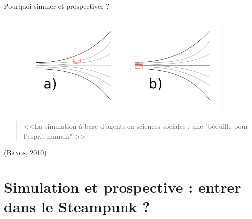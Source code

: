 \documentclass[newPxFont]{beamer}
\begin{document}
\begin{frame}[c]{Pourquoi simuler et prospectiver ?}
  \vspace{-2em}
  \begin{figure}
   \includegraphics[height=5cm]{img/a_prospective_simulation.png}
  \end{figure}
  \vspace{-1em}
  \begin{quote}
    <<La simulation à base d’agents en sciences sociales : une "béquille pour l’esprit humain" >>
  \end{quote}
  \hspace*{\fill}\textsc{(Banos, 2010)}
\end{frame}
%
%
\section{Simulation et prospective : entrer dans le Steampunk ?}
\end{document}
